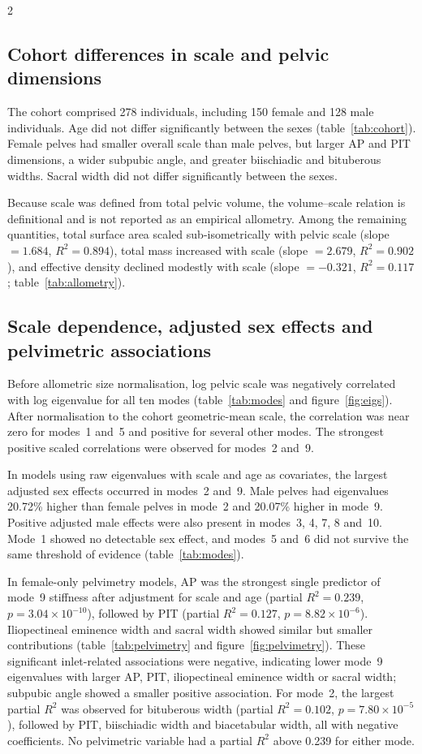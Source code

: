 \documentclass[openacc]{rsproca_new}
\begin{document}
\begin{multicols}{2}
\subsection{Cohort differences in scale and pelvic dimensions}

The cohort comprised 278 individuals, including 150 female and 128 male individuals. Age did not differ significantly between the sexes (table~\ref{tab:cohort}). Female pelves had smaller overall scale than male pelves, but larger AP and PIT dimensions, a wider subpubic angle, and greater biischiadic and bituberous widths. Sacral width did not differ significantly between the sexes.

Because scale was defined from total pelvic volume, the volume--scale relation is definitional and is not reported as an empirical allometry. Among the remaining quantities, total surface area scaled sub-isometrically with pelvic scale (slope $=1.684$, $R^2=0.894$), total mass increased with scale (slope $=2.679$, $R^2=0.902$), and effective density declined modestly with scale (slope $=-0.321$, $R^2=0.117$; table~\ref{tab:allometry}).

\subsection{Scale dependence, adjusted sex effects and pelvimetric associations}

Before allometric size normalisation, log pelvic scale was negatively correlated with log eigenvalue for all ten modes (table~\ref{tab:modes} and figure~\ref{fig:eigs}). After normalisation to the cohort geometric-mean scale, the correlation was near zero for modes~1 and~5 and positive for several other modes. The strongest positive scaled correlations were observed for modes~2 and~9.

In models using raw eigenvalues with scale and age as covariates, the largest adjusted sex effects occurred in modes~2 and~9. Male pelves had eigenvalues 20.72\% higher than female pelves in mode~2 and 20.07\% higher in mode~9. Positive adjusted male effects were also present in modes~3, 4, 7, 8 and~10. Mode~1 showed no detectable sex effect, and modes~5 and~6 did not survive the same threshold of evidence (table~\ref{tab:modes}).

In female-only pelvimetry models, AP was the strongest single predictor of mode~9 stiffness after adjustment for scale and age (partial $R^2=0.239$, $p=3.04 \times 10^{-10}$), followed by PIT (partial $R^2=0.127$, $p=8.82 \times 10^{-6}$). Iliopectineal eminence width and sacral width showed similar but smaller contributions (table~\ref{tab:pelvimetry} and figure~\ref{fig:pelvimetry}). These significant inlet-related associations were negative, indicating lower mode~9 eigenvalues with larger AP, PIT, iliopectineal eminence width or sacral width; subpubic angle showed a smaller positive association. For mode~2, the largest partial $R^2$ was observed for bituberous width (partial $R^2=0.102$, $p=7.80 \times 10^{-5}$), followed by PIT, biischiadic width and biacetabular width, all with negative coefficients. No pelvimetric variable had a partial $R^2$ above 0.239 for either mode.


\end{multicols}
\end{document}
